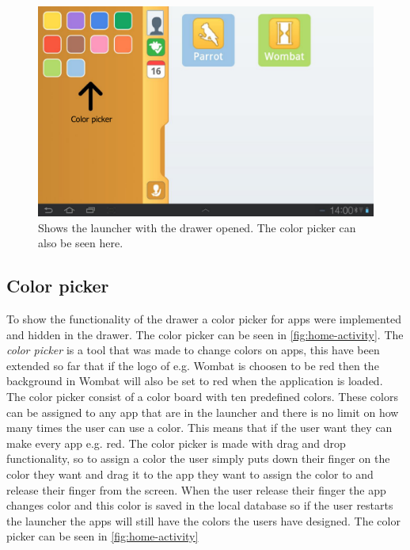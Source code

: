 \begin{figure}[h!]
	\centering
	\includegraphics[scale=0.2]{gfx/home-activity_open}
	\caption{Shows the launcher with the drawer opened. The color picker can also be seen here.}
	\label{fig:home-activity}
\end{figure}

\subsection{Color picker}\label{home:colorpicker}

To show the functionality of the drawer a color picker for apps were implemented and hidden in the drawer. The color picker can be seen in \autoref{fig:home-activity}.
The \textit{color picker} is a tool that was made to change colors on apps, this have been extended so far that if the logo of e.g. Wombat is choosen to be red then the background in Wombat will also be set to red when the application is loaded.
The color picker consist of a color board with ten predefined \giraf[] colors. These colors can be assigned to any app that are in the launcher and there is no limit on how many times the user can use a color. This means that if the user want they can make every app e.g. red.
The color picker is made with drag and drop functionality, so to assign a color the user simply puts down their finger on the color they want and drag it to the app they want to assign the color to and release their finger from the screen.
When the user release their finger the app changes color and this color is saved in the local database so if the user restarts the launcher the apps will still have the colors the users have designed. 
The color picker can be seen in \autoref{fig:home-activity}

